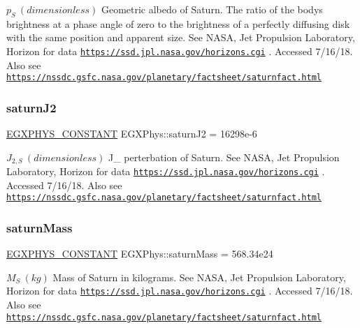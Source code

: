 $ p_{S} \ (dimensionless)$ Geometric albedo of Saturn. The ratio of the body\textquotesingle{}s brightness at a phase angle of zero to the brightness of a perfectly diffusing disk with the same position and apparent size. See N\+A\+SA, Jet Propulsion Laboratory, Horizon for data \href{https://ssd.jpl.nasa.gov/horizons.cgi}{\tt https\+://ssd.\+jpl.\+nasa.\+gov/horizons.\+cgi} . Accessed 7/16/18. Also see \href{https://nssdc.gsfc.nasa.gov/planetary/factsheet/saturnfact.html}{\tt https\+://nssdc.\+gsfc.\+nasa.\+gov/planetary/factsheet/saturnfact.\+html} \mbox{\label{group___e_g_x_phys-_constants-_astrophysics-_solar_system-_saturn-_bulk_ga8646bad89fe940c47520cd30c8c89b0b}} 
\subsubsection{\texorpdfstring{saturn\+J2}{saturnJ2}}
{\footnotesize\ttfamily \mbox{\hyperlink{group___e_g_x_phys-_constants-_macros_ga76980d288494ce1714c9ac68a95ba702}{E\+G\+X\+P\+H\+Y\+S\+\_\+\+C\+O\+N\+S\+T\+A\+NT}} E\+G\+X\+Phys\+::saturn\+J2 = 16298e-\/6}

$ J_{2,S } \ (dimensionless)$ J\+\_ perterbation of Saturn. See N\+A\+SA, Jet Propulsion Laboratory, Horizon for data \href{https://ssd.jpl.nasa.gov/horizons.cgi}{\tt https\+://ssd.\+jpl.\+nasa.\+gov/horizons.\+cgi} . Accessed 7/16/18. Also see \href{https://nssdc.gsfc.nasa.gov/planetary/factsheet/saturnfact.html}{\tt https\+://nssdc.\+gsfc.\+nasa.\+gov/planetary/factsheet/saturnfact.\+html} \mbox{\label{group___e_g_x_phys-_constants-_astrophysics-_solar_system-_saturn-_bulk_gaa1f93285c764fe2bd26429609e8dfb3f}} 
\subsubsection{\texorpdfstring{saturn\+Mass}{saturnMass}}
{\footnotesize\ttfamily \mbox{\hyperlink{group___e_g_x_phys-_constants-_macros_ga76980d288494ce1714c9ac68a95ba702}{E\+G\+X\+P\+H\+Y\+S\+\_\+\+C\+O\+N\+S\+T\+A\+NT}} E\+G\+X\+Phys\+::saturn\+Mass = 568.\+34e24}

$M_{S} \ (kg)$ Mass of Saturn in kilograms. See N\+A\+SA, Jet Propulsion Laboratory, Horizon for data \href{https://ssd.jpl.nasa.gov/horizons.cgi}{\tt https\+://ssd.\+jpl.\+nasa.\+gov/horizons.\+cgi} . Accessed 7/16/18. Also see \href{https://nssdc.gsfc.nasa.gov/planetary/factsheet/saturnfact.html}{\tt https\+://nssdc.\+gsfc.\+nasa.\+gov/planetary/factsheet/saturnfact.\+html} \mbox{\label{group___e_g_x_phys-_constants-_astrophysics-_solar_system-_saturn-_bulk_gaf0076aaa3db73a1ec1752aec50bcc42d}} 
